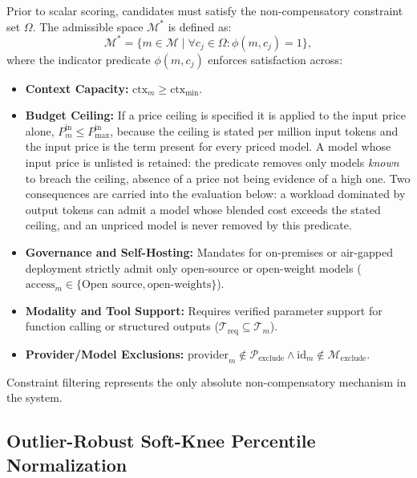 \documentclass[pdflatex,sn-mathphys-num]{sn-jnl}
\theoremstyle{thmstyleone}
\theoremstyle{thmstylethree}
\begin{document}
Prior to scalar scoring, candidates must satisfy the non-compensatory constraint set $\Omega$. The admissible space $\mathcal{M}^*$ is defined as:
\begin{equation}\label{eq:filtering}
\mathcal{M}^* = \{ m \in \mathcal{M} \mid \forall c_j \in \Omega : \phi(m, c_j) = 1 \},
\end{equation}
where the indicator predicate $\phi(m, c_j)$ enforces satisfaction across:
\begin{itemize}
  \item \textbf{Context Capacity:} $\text{ctx}_m \ge \text{ctx}_{\min}$.
  \item \textbf{Budget Ceiling:} If a price ceiling is specified it is applied to the input price alone, $P_m^{\text{in}} \le P_{\max}^{\text{in}}$, because the ceiling is stated per million input tokens and the input price is the term present for every priced model. A model whose input price is unlisted is retained: the predicate removes only models \emph{known} to breach the ceiling, absence of a price not being evidence of a high one. Two consequences are carried into the evaluation below: a workload dominated by output tokens can admit a model whose blended cost exceeds the stated ceiling, and an unpriced model is never removed by this predicate.
  \item \textbf{Governance and Self-Hosting:} Mandates for on-premises or air-gapped deployment strictly admit only open-source or open-weight models ($\text{access}_m \in \{\text{Open source}, \text{open-weights}\}$).
  \item \textbf{Modality and Tool Support:} Requires verified parameter support for function calling or structured outputs ($\mathcal{T}_{\text{req}} \subseteq \mathcal{T}_m$).
  \item \textbf{Provider/Model Exclusions:} $\text{provider}_m \notin \mathcal{P}_{\text{exclude}} \land \text{id}_m \notin \mathcal{M}_{\text{exclude}}$.
\end{itemize}
Constraint filtering represents the only absolute non-compensatory mechanism in the system.

\subsection{Outlier-Robust Soft-Knee Percentile Normalization}\label{subsec:normalization}
\end{document}
